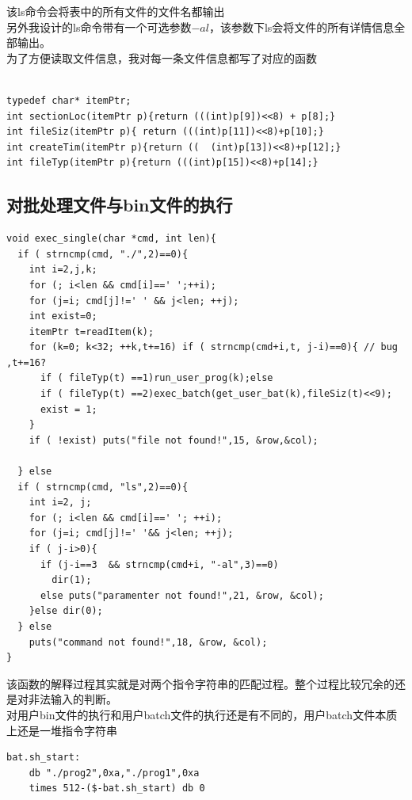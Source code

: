 \documentclass[a4paper,11pt,UTF8]{ctexart}
\begin{document}
      该ls命令会将表中的所有文件的文件名都输出\\
      另外我设计的ls命令带有一个可选参数$-al$，该参数下ls会将文件的所有详情信息全部输出。\\
      为了方便读取文件信息，我对每一条文件信息都写了对应的函数
      \begin{lstlisting}[caption={一段C代码},captionpos=b]

typedef char* itemPtr;
int sectionLoc(itemPtr p){return (((int)p[9])<<8) + p[8];}
int fileSiz(itemPtr p){ return (((int)p[11])<<8)+p[10];}
int createTim(itemPtr p){return ((  (int)p[13])<<8)+p[12];}
int fileTyp(itemPtr p){return (((int)p[15])<<8)+p[14];}
      \end{lstlisting}
      \subsection{对批处理文件与bin文件的执行}
  
      \begin{lstlisting}[caption={一段C代码},captionpos=b]
void exec_single(char *cmd, int len){
  if ( strncmp(cmd, "./",2)==0){
    int i=2,j,k;
    for (; i<len && cmd[i]==' ';++i);
    for (j=i; cmd[j]!=' ' && j<len; ++j);
    int exist=0;
    itemPtr t=readItem(k);
    for (k=0; k<32; ++k,t+=16) if ( strncmp(cmd+i,t, j-i)==0){ // bug ,t+=16?
      if ( fileTyp(t) ==1)run_user_prog(k);else
      if ( fileTyp(t) ==2)exec_batch(get_user_bat(k),fileSiz(t)<<9);
      exist = 1;
    }
    if ( !exist) puts("file not found!",15, &row,&col);
    
  }	else
  if ( strncmp(cmd, "ls",2)==0){
    int i=2, j;
    for (; i<len && cmd[i]==' '; ++i);
    for (j=i; cmd[j]!=' '&& j<len; ++j);
    if ( j-i>0){
      if (j-i==3  && strncmp(cmd+i, "-al",3)==0)
        dir(1);
      else puts("paramenter not found!",21, &row, &col);
    }else dir(0);
  }	else
    puts("command not found!",18, &row, &col);
}
      \end{lstlisting}
      该函数的解释过程其实就是对两个指令字符串的匹配过程。整个过程比较冗余的还是对非法输入的判断。\\
      对用户bin文件的执行和用户batch文件的执行还是有不同的，用户batch文件本质上还是一堆指令字符串\\
  \begin{lstlisting}[caption={asm code },tabsize=4,basicstyle=\footnotesize,captionpos=b]
    bat.sh_start:
    db "./prog2",0xa,"./prog1",0xa
    times 512-($-bat.sh_start) db 0
      
  \end{lstlisting}
  
\end{document}
